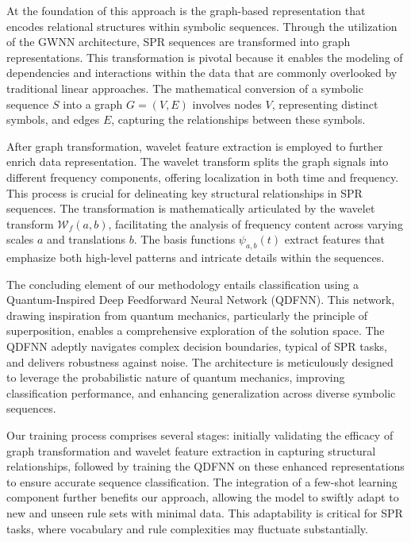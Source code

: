 \documentclass{article}
\begin{document}
At the foundation of this approach is the graph-based representation that encodes relational structures within symbolic sequences. Through the utilization of the GWNN architecture, SPR sequences are transformed into graph representations. This transformation is pivotal because it enables the modeling of dependencies and interactions within the data that are commonly overlooked by traditional linear approaches. The mathematical conversion of a symbolic sequence \( S \) into a graph \( G = (V, E) \) involves nodes \( V \), representing distinct symbols, and edges \( E \), capturing the relationships between these symbols.

After graph transformation, wavelet feature extraction is employed to further enrich data representation. The wavelet transform splits the graph signals into different frequency components, offering localization in both time and frequency. This process is crucial for delineating key structural relationships in SPR sequences. The transformation is mathematically articulated by the wavelet transform \( \mathcal{W}_f(a, b) \), facilitating the analysis of frequency content across varying scales \( a \) and translations \( b \). The basis functions \( \psi_{a,b}(t) \) extract features that emphasize both high-level patterns and intricate details within the sequences.

The concluding element of our methodology entails classification using a Quantum-Inspired Deep Feedforward Neural Network (QDFNN). This network, drawing inspiration from quantum mechanics, particularly the principle of superposition, enables a comprehensive exploration of the solution space. The QDFNN adeptly navigates complex decision boundaries, typical of SPR tasks, and delivers robustness against noise. The architecture is meticulously designed to leverage the probabilistic nature of quantum mechanics, improving classification performance, and enhancing generalization across diverse symbolic sequences.

Our training process comprises several stages: initially validating the efficacy of graph transformation and wavelet feature extraction in capturing structural relationships, followed by training the QDFNN on these enhanced representations to ensure accurate sequence classification. The integration of a few-shot learning component further benefits our approach, allowing the model to swiftly adapt to new and unseen rule sets with minimal data. This adaptability is critical for SPR tasks, where vocabulary and rule complexities may fluctuate substantially.
\end{document}
